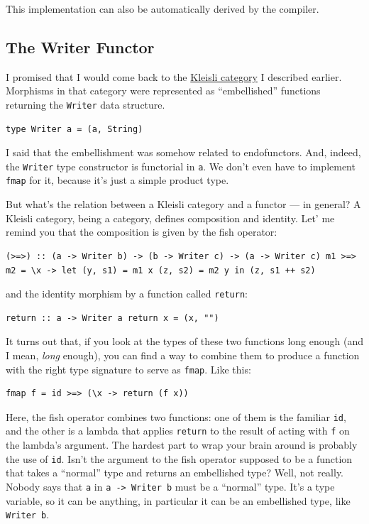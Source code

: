 This implementation can also be automatically derived by the compiler.

\subsection{The Writer Functor}\label{the-writer-functor}

I promised that I would come back to the
\href{https://bartoszmilewski.com/2014/12/23/kleisli-categories/}{Kleisli
category} I described earlier. Morphisms in that category were
represented as ``embellished'' functions returning the \texttt{Writer}
data structure.

\begin{verbatim}
type Writer a = (a, String)
\end{verbatim}

I said that the embellishment was somehow related to endofunctors. And,
indeed, the \texttt{Writer} type constructor is functorial in
\texttt{a}. We don't even have to implement \texttt{fmap} for it,
because it's just a simple product type.

But what's the relation between a Kleisli category and a functor --- in
general? A Kleisli category, being a category, defines composition and
identity. Let' me remind you that the composition is given by the fish
operator:

\begin{verbatim}
(>=>) :: (a -> Writer b) -> (b -> Writer c) -> (a -> Writer c) m1 >=> m2 = \x -> let (y, s1) = m1 x (z, s2) = m2 y in (z, s1 ++ s2)
\end{verbatim}

and the identity morphism by a function called \texttt{return}:

\begin{verbatim}
return :: a -> Writer a return x = (x, "")
\end{verbatim}

It turns out that, if you look at the types of these two functions long
enough (and I mean, \emph{long} enough), you can find a way to combine
them to produce a function with the right type signature to serve as
\texttt{fmap}. Like this:

\begin{verbatim}
fmap f = id >=> (\x -> return (f x))
\end{verbatim}

Here, the fish operator combines two functions: one of them is the
familiar \texttt{id}, and the other is a lambda that applies
\texttt{return} to the result of acting with \texttt{f} on the lambda's
argument. The hardest part to wrap your brain around is probably the use
of \texttt{id}. Isn't the argument to the fish operator supposed to be a
function that takes a ``normal'' type and returns an embellished type?
Well, not really. Nobody says that \texttt{a} in
\texttt{a\ -\textgreater{}\ Writer\ b} must be a ``normal'' type. It's a
type variable, so it can be anything, in particular it can be an
embellished type, like \texttt{Writer\ b}.

